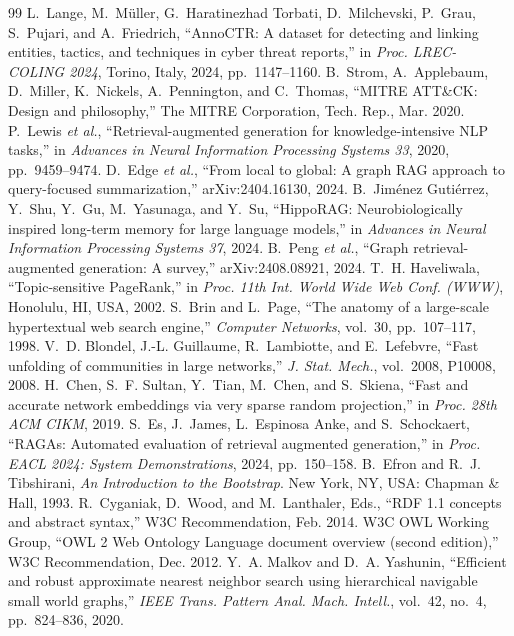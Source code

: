 \documentclass[conference,letterpaper]{IEEEtran}
\begin{document}
\begin{thebibliography}{99}
\footnotesize
{} L.~Lange, M.~M\"uller, G.~Haratinezhad Torbati, D.~Milchevski, P.~Grau, S.~Pujari, and A.~Friedrich, ``AnnoCTR: A dataset for detecting and linking entities, tactics, and techniques in cyber threat reports,'' in \emph{Proc. LREC-COLING 2024}, Torino, Italy, 2024, pp.~1147--1160.
 B.~Strom, A.~Applebaum, D.~Miller, K.~Nickels, A.~Pennington, and C.~Thomas, ``MITRE ATT\&CK: Design and philosophy,'' The MITRE Corporation, Tech. Rep., Mar. 2020.
 P.~Lewis \emph{et al.}, ``Retrieval-augmented generation for knowledge-intensive NLP tasks,'' in \emph{Advances in Neural Information Processing Systems 33}, 2020, pp.~9459--9474.
 D.~Edge \emph{et al.}, ``From local to global: A graph RAG approach to query-focused summarization,'' arXiv:2404.16130, 2024.
 B.~Jim\'enez Guti\'errez, Y.~Shu, Y.~Gu, M.~Yasunaga, and Y.~Su, ``HippoRAG: Neurobiologically inspired long-term memory for large language models,'' in \emph{Advances in Neural Information Processing Systems 37}, 2024.
 B.~Peng \emph{et al.}, ``Graph retrieval-augmented generation: A survey,'' arXiv:2408.08921, 2024.
 T.~H. Haveliwala, ``Topic-sensitive PageRank,'' in \emph{Proc. 11th Int. World Wide Web Conf. (WWW)}, Honolulu, HI, USA, 2002.
 S.~Brin and L.~Page, ``The anatomy of a large-scale hypertextual web search engine,'' \emph{Computer Networks}, vol.~30, pp.~107--117, 1998.
 V.~D. Blondel, J.-L. Guillaume, R.~Lambiotte, and E.~Lefebvre, ``Fast unfolding of communities in large networks,'' \emph{J. Stat. Mech.}, vol.~2008, P10008, 2008.
 H.~Chen, S.~F. Sultan, Y.~Tian, M.~Chen, and S.~Skiena, ``Fast and accurate network embeddings via very sparse random projection,'' in \emph{Proc. 28th ACM CIKM}, 2019.
 S.~Es, J.~James, L.~Espinosa Anke, and S.~Schockaert, ``RAGAs: Automated evaluation of retrieval augmented generation,'' in \emph{Proc. EACL 2024: System Demonstrations}, 2024, pp.~150--158.
 B.~Efron and R.~J. Tibshirani, \emph{An Introduction to the Bootstrap}. New York, NY, USA: Chapman \& Hall, 1993.
 R.~Cyganiak, D.~Wood, and M.~Lanthaler, Eds., ``RDF 1.1 concepts and abstract syntax,'' W3C Recommendation, Feb. 2014.
 W3C OWL Working Group, ``OWL 2 Web Ontology Language document overview (second edition),'' W3C Recommendation, Dec. 2012.
 Y.~A. Malkov and D.~A. Yashunin, ``Efficient and robust approximate nearest neighbor search using hierarchical navigable small world graphs,'' \emph{IEEE Trans. Pattern Anal. Mach. Intell.}, vol.~42, no.~4, pp.~824--836, 2020.

\end{thebibliography}
\end{document}
